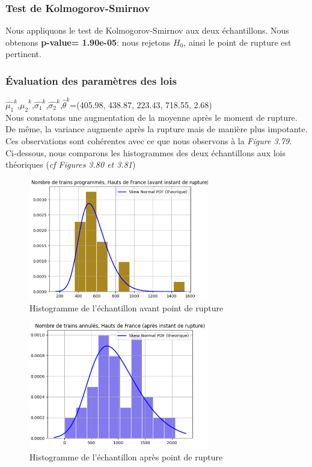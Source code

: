 {\subsubsection{Test de Kolmogorov-Smirnov}

Nous appliquons le test de Kolmogorov-Smirnov aux deux échantillons. Nous obtenons \textbf{p-value= 1.90e-05}: nous rejetons $H_0$, ainsi le point de rupture est pertinent.

\subsubsection{Évaluation des paramètres des lois}

$\hat{\mu_1}^k$,$\hat{\mu_2}^k$,$\hat{\sigma_1}^k$,$\hat{\sigma_2}^k$,$\hat{\theta}^k$=(405.98, 438.87, 223.43, 718.55, 2.68)\\

Nous constatons une augmentation de la moyenne après le moment de rupture. De même, la variance augmente après la rupture mais de manière plus impotante. Ces observations sont cohérentes avec ce que nous observons à la \textit{Figure 3.79}.\\

Ci-dessous, nous comparons les histogrammes des deux échantillons aux lois théoriques (\textit{cf Figures 3.80 et 3.81})

\begin{figure}[H]
  \centering
  \includegraphics[width=0.7\textwidth]{HF_TA_4.png}
  \caption{Histogramme de l'échantillon avant point de rupture}
\end{figure}

\begin{figure}[H]
  \centering
  \includegraphics[width=0.7\textwidth]{HF_TA_5.png}
  \caption{Histogramme de l'échantillon après point de rupture}
\end{figure}

}
